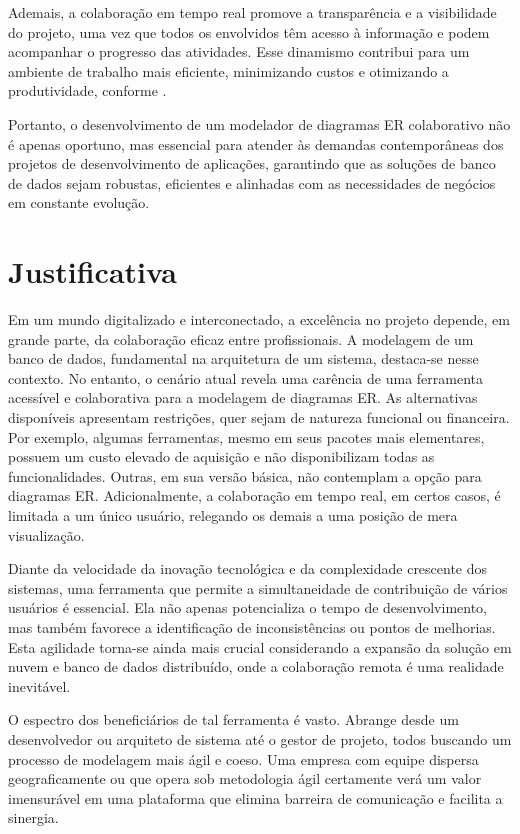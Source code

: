 Ademais, a colaboração em tempo real promove a transparência e a visibilidade do projeto, uma vez que todos os envolvidos têm acesso à informação e podem acompanhar o progresso das atividades. Esse dinamismo contribui para um ambiente de trabalho mais eficiente, minimizando custos e otimizando a produtividade, conforme \cite{Fuks2002}.

 Portanto, o desenvolvimento de um modelador de diagramas ER colaborativo não é apenas oportuno, mas essencial para atender às demandas contemporâneas dos projetos de desenvolvimento de aplicações, garantindo que as soluções de banco de dados sejam robustas, eficientes e alinhadas com as necessidades de negócios em constante evolução.
 
%
%
\section{Justificativa}

Em um mundo digitalizado e interconectado, a excelência no projeto depende, em grande parte, da colaboração eficaz entre profissionais. A modelagem de um banco de dados, fundamental na arquitetura de um sistema, destaca-se nesse contexto. No entanto, o cenário atual revela uma carência de uma ferramenta acessível e colaborativa para a modelagem de diagramas ER. As alternativas disponíveis apresentam restrições, quer sejam de natureza funcional ou financeira. Por exemplo, algumas ferramentas, mesmo em seus pacotes mais elementares, possuem um custo elevado de aquisição e não disponibilizam todas as funcionalidades. Outras, em sua versão básica, não contemplam a opção para diagramas ER. Adicionalmente, a colaboração em tempo real, em certos casos, é limitada a um único usuário, relegando os demais a uma posição de mera visualização.

Diante da velocidade da inovação tecnológica e da complexidade crescente dos sistemas, uma ferramenta que permite a simultaneidade de contribuição de vários usuários é essencial. Ela não apenas potencializa o tempo de desenvolvimento, mas também favorece a identificação de inconsistências ou pontos de melhorias. Esta agilidade torna-se ainda mais crucial considerando a expansão da solução em nuvem e banco de dados distribuído, onde a colaboração remota é uma realidade inevitável.

O espectro dos beneficiários de tal ferramenta é vasto. Abrange desde um desenvolvedor ou arquiteto de sistema até o gestor de projeto, todos buscando um processo de modelagem mais ágil e coeso. Uma empresa com equipe dispersa geograficamente ou que opera sob metodologia ágil certamente verá um valor imensurável em uma plataforma que elimina barreira de comunicação e facilita a sinergia.

